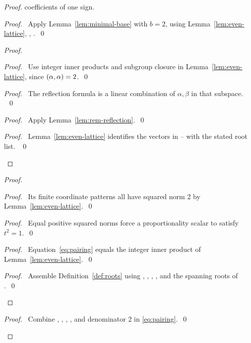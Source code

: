 \begin{proof}
{coefficients of one sign.}
\begin{proof}\pf\ Apply Lemma~\ref{lem:minimal-base} with $b=2$, using
Lemma~\ref{lem:even-lattice}, , .~\qed\end{proof}
\begin{proof}
\begin{proof}\pf\ Use integer inner products and subgroup closure in
Lemma~\ref{lem:even-lattice}, since $(\alpha,\alpha)=2$.~\qed\end{proof}
\begin{proof}\pf\ The reflection formula is a linear combination of
$\alpha,\beta$ in that subspace. ~\qed\end{proof}
\begin{proof}\pf\ Apply Lemma~\ref{lem:rem-reflection}.~\qed\end{proof}
\qedstep
\begin{proof}\pf\ Lemma~\ref{lem:even-lattice} identifies the vectors in
-- with the stated root list. ~\qed\end{proof}
\end{proof}
\begin{proof}
\begin{proof}\pf\ Its finite coordinate patterns all have squared norm 2
by Lemma~\ref{lem:even-lattice}.~\qed\end{proof}
\begin{proof}\pf\ Equal positive squared norms force a proportionality
scalar to satisfy $t^2=1$.~\qed\end{proof}
\begin{proof}\pf\ Equation~\eqref{eq:pairing} equals the integer inner
product of Lemma~\ref{lem:even-lattice}.~\qed\end{proof}
\qedstep
\begin{proof}\pf\ Assemble Definition~\ref{def:roots} using
, , ,
, and the spanning roots of .~\qed\end{proof}
\end{proof}
\qedstep
\begin{proof}\pf\ Combine , ,
, , and denominator 2 in \eqref{eq:pairing}.~\qed\end{proof}
\end{proof}

